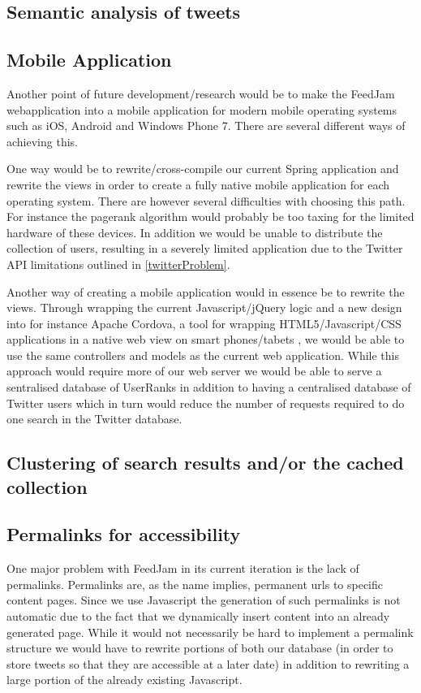 \subsection{Semantic analysis of tweets} %
\label{semtanticAnalysation}

\subsection{Mobile Application}
Another point of future development/research would be to make the FeedJam webapplication into a mobile application for modern mobile operating systems such as iOS, Android and Windows Phone 7. There are several different ways of achieving this. 

One way would be to rewrite/cross-compile our current Spring application and rewrite the views in order to create a fully native mobile application for each operating system. There are however several difficulties with choosing this path. For instance the pagerank algorithm would probably be too taxing for the limited hardware of these devices. In addition we would be unable to distribute the collection of users, resulting in a severely limited application due to the Twitter API limitations outlined in \ref{twitterProblem}.

Another way of creating a mobile application would in essence be to rewrite the views. Through wrapping the current Javascript/jQuery logic and a new design into for instance Apache Cordova, a tool for wrapping HTML5/Javascript/CSS applications in a native web view on smart phones/tabets \cite{ApacheCordova}, we would be able to use the same controllers and models as the current web application. While this approach would require more of our web server we would be able to serve a sentralised database of UserRanks in addition to having a centralised database of Twitter users which in turn would reduce the number of requests required to do one search in the Twitter database.

\subsection{Clustering of search results and/or the cached collection} %

\subsection{Permalinks for accessibility}
One major problem with FeedJam in its current iteration is the lack of permalinks. Permalinks are, as the name implies, permanent urls to specific content pages. Since we use Javascript the generation of such permalinks is not automatic due to the fact that we dynamically insert content into an already generated page. While it would not necessarily be hard to implement a permalink structure we would have to rewrite portions of both our database (in order to store tweets so that they are accessible at a later date) in addition to rewriting a large portion of the already existing Javascript.